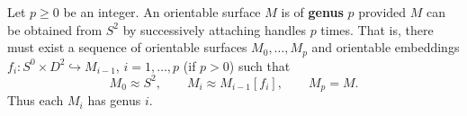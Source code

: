 Let $p \geqslant 0$ be an integer. An orientable surface $M$ is of \textbf{genus} $p$ provided $M$ can be obtained from $S^2$ by successively attaching handles $p$ times. That is, there must exist a sequence of orientable surfaces $M_0, \ldots, M_p$ and orientable embeddings $f_i: S^0 \times D^2 \hookrightarrow M_{i-1}$, $i = 1, \ldots, p$ (if $p > 0$) such that
$$
M_0 \approx S^2, \qquad M_i \approx M_{i-1}[f_i], \qquad M_p = M.
$$
Thus each $M_i$ has genus $i$.
